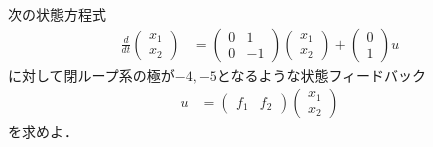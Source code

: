 \documentclass[a4paper,11pt]{jreport}
\begin{document}
次の状態方程式
\begin{align*}
	\frac{d}{dt}
	\left (
	\begin{array}{c}
	 x_1 \\ x_2 
	\end{array}
	\right )
	& = 
	\left (
	\begin{array}{cc}
	 0 & 1 \\
	 0 & -1
	\end{array}
	\right )
	\left (
	\begin{array}{c}
	 x_1 \\ x_2 
	\end{array}
	\right )
	+
	\left (
	\begin{array}{c}
	 0 \\ 1 
	\end{array}
	\right )
	u
\end{align*}
に対して閉ループ系の極が$-4,-5$となるような状態フィードバック
\begin{align*}
	u 
	&=
	\left (
	\begin{array}{cc}
	 f_1 & f_2
	\end{array}
	\right )
	\left (
	\begin{array}{c}
	 x_1 \\ x_2 
	\end{array}
	\right )
\end{align*}
を求めよ．
\\
\end{document}
